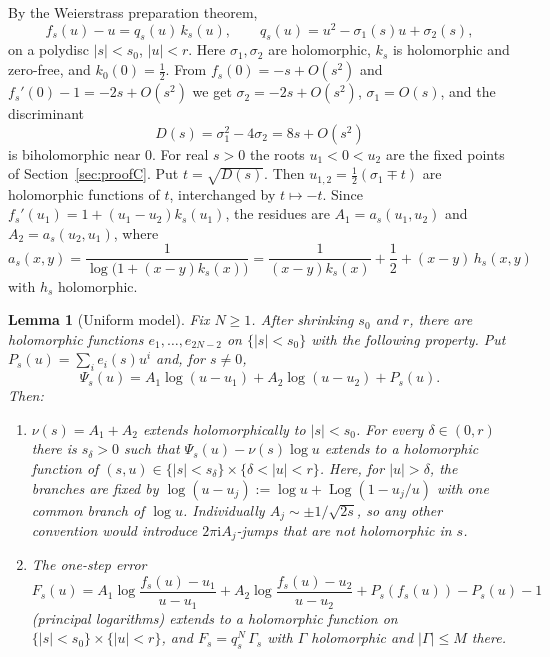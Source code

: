 \documentclass[11pt]{amsart}
\newtheorem{lemma}[theorem]{Lemma}
\theoremstyle{definition}
\newcommand{\ii}{\mathrm{i}}
\begin{document}
By the Weierstrass preparation theorem,
\begin{equation}\label{eq:weier}
 f_s(u)-u=q_s(u)\,k_s(u),\qquad q_s(u)=u^2-\sigma_1(s)u+\sigma_2(s),
\end{equation}
on a polydisc $|s|<s_0$, $|u|<r$.  Here $\sigma_1,\sigma_2$ are holomorphic,
$k_s$ is holomorphic and zero-free, and $k_0(0)=\tfrac12$.  From
$f_s(0)=-s+O(s^2)$ and $f_s'(0)-1=-2s+O(s^2)$ we get $\sigma_2=-2s+O(s^2)$,
$\sigma_1=O(s)$, and the discriminant
\[
 D(s)=\sigma_1^2-4\sigma_2=8s+O(s^2)
\]
is biholomorphic near $0$.  For real $s>0$ the roots $u_1<0<u_2$ are the fixed
points of Section~\ref{sec:proofC}.  Put $t=\sqrt{D(s)}$.  Then
$u_{1,2}=\tfrac12(\sigma_1\mp t)$ are holomorphic functions of $t$, interchanged by
$t\mapsto-t$.  Since $f_s'(u_1)=1+(u_1-u_2)k_s(u_1)$, the residues are
$A_1=a_s(u_1,u_2)$ and $A_2=a_s(u_2,u_1)$, where
\[
 a_s(x,y)=\frac1{\log\bigl(1+(x-y)k_s(x)\bigr)}
 =\frac1{(x-y)k_s(x)}+\frac12+(x-y)\,h_s(x,y)
\]
with $h_s$ holomorphic.

\begin{lemma}[Uniform model]\label{lem:model}
Fix $N\ge1$.  After shrinking $s_0$ and $r$, there are holomorphic functions
$e_1,\dots,e_{2N-2}$ on $\{|s|<s_0\}$ with the following property.  Put
$P_s(u)=\sum_ie_i(s)u^i$ and, for $s\ne0$,
\[
 \Psi_s(u)=A_1\log(u-u_1)+A_2\log(u-u_2)+P_s(u).
\]
Then:
\begin{enumerate}
\item $\nu(s)=A_1+A_2$ extends holomorphically to $|s|<s_0$.  For every
  $\delta\in(0,r)$ there is $s_\delta>0$ such that
  $\Psi_s(u)-\nu(s)\log u$ extends to a holomorphic function of
  $(s,u)\in\{|s|<s_\delta\}\times\{\delta<|u|<r\}$.  Here, for $|u|>\delta$,
  the branches are fixed by $\log(u-u_j):=\log u+\operatorname{Log}(1-u_j/u)$
  with one common branch of $\log u$.  Individually $A_j\sim\pm1/\sqrt{2s}$, so
  any other convention would introduce $2\pi\ii A_j$-jumps that are not
  holomorphic in $s$.
\item The one-step error
  \[
   F_s(u)=A_1\log\frac{f_s(u)-u_1}{u-u_1}+A_2\log\frac{f_s(u)-u_2}{u-u_2}
   +P_s(f_s(u))-P_s(u)-1
  \]
  (principal logarithms) extends to a holomorphic function on
  $\{|s|<s_0\}\times\{|u|<r\}$, and $F_s=q_s^N\,\Gamma_s$ with $\Gamma$
  holomorphic and $|\Gamma|\le M$ there.
\end{enumerate}
\end{lemma}
\end{document}
